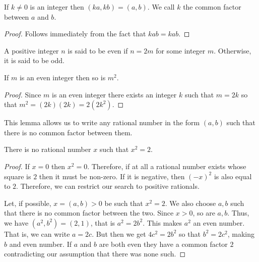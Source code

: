 \begin{lem}\label{c3s4l1}
If $k \ne 0$ is an integer then $(ka, kb) = (a, b)$. We call $k$ the 
common factor between $a$ and $b$.
\end{lem}
\begin{proof}
Follows immediately from the fact that $kab = kab$.
\end{proof}

\begin{defn}\label{c3s4d2}
A positive integer $n$ is said to be even if $n = 2m$ for some integer 
$m$. Otherwise, it is said to be odd.
\end{defn}

\begin{lem}\label{c4s4l2}
If $m$ is an even integer then so is $m^2$.
\end{lem}
\begin{proof}
Since $m$ is an even integer there exists an integer $k$ such that $m = 
2k$ so that $m^2 = (2k)(2k) = 2(2k^2)$.
\end{proof}

This lemma allows us to write any rational number in the form $(a, b)$
such that there is no common factor between them.

\begin{prop}\label{c3s4p3}
There is no rational number $x$ such that $x^2 = 2$.
\end{prop}
\begin{proof}
If $x = 0$ then $x^2 = 0$. Therefore, if at all a rational number exists
whose square is $2$ then it must be non-zero. If it is negative, then
$(-x)^2$ is also equal to $2$. Therefore, we can restrict our search to
positive rationals. 

Let, if possible, $x = (a, b) > 0$ be such that $x^2 = 2$. We also choose
$a, b$ such that there is no common factor between the two. Since $x > 0$,
so are $a, b$. Thus, we have $(a^2, b^2) = (2, 1)$, that is $a^2 = 2b^2$.
This makes $a^2$ an even number. That is, we can write $a = 2c$. But then
we get $4c^2 = 2b^2$ so that $ b^2 = 2c^2$, making $b$ and even number.
If $a$ and $b$ are both even they have a common factor $2$ contradicting
our assumption that there was none such.
\end{proof}

